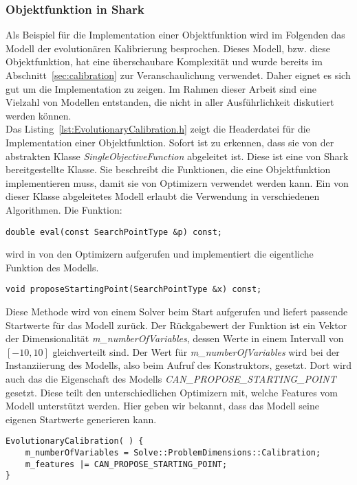 \subsubsection{Objektfunktion in Shark}
\label{sec:Shark_model}
%
Als Beispiel für die Implementation einer Objektfunktion wird im Folgenden das Modell der evolutionären Kalibrierung besprochen. Dieses Modell, bzw. diese Objektfunktion, hat eine überschaubare Komplexität und wurde bereits im Abschnitt~\ref{sec:calibration} zur Veranschaulichung verwendet. Daher eignet es sich gut um die Implementation zu zeigen. Im Rahmen dieser Arbeit sind eine Vielzahl von Modellen entstanden, die nicht in aller Ausführlichkeit diskutiert werden können.\\
%
Das Listing~\ref{lst:EvolutionaryCalibration.h} zeigt die Headerdatei für die Implementation einer Objektfunktion. Sofort ist zu erkennen, dass sie von der abstrakten Klasse \textit{SingleObjectiveFunction} abgeleitet ist. Diese ist eine von Shark bereitgestellte Klasse. Sie beschreibt die Funktionen, die eine Objektfunktion implementieren muss, damit sie von Optimizern verwendet werden kann. Ein von dieser Klasse abgeleitetes Modell erlaubt die Verwendung in verschiedenen Algorithmen. Die Funktion:
%
\begin{lstlisting}
double eval(const SearchPointType &p) const;
\end{lstlisting}
%
wird in von den Optimizern aufgerufen und implementiert die eigentliche Funktion des Modells.
%
\begin{lstlisting}[label=EvolutionaryCalibration_2]
void proposeStartingPoint(SearchPointType &x) const;
\end{lstlisting}
%
Diese Methode wird von einem Solver beim Start aufgerufen und liefert passende Startwerte für das Modell zurück.
Der Rückgabewert der Funktion ist ein Vektor der Dimensionalität  \textit{m\_numberOfVariables}, dessen Werte in einem Intervall von $[-10,10]$ gleichverteilt sind.
Der Wert für \textit{m\_numberOfVariables} wird bei der Instanziierung des Modells, also beim Aufruf des Konstruktors, gesetzt.
Dort wird auch das die Eigenschaft des Modells \textit{CAN\_PROPOSE\_STARTING\_POINT} gesetzt. Diese teilt den unterschiedlichen Optimizern mit, welche Features vom Modell unterstützt werden. Hier geben wir bekannt, dass das Modell seine eigenen Startwerte generieren kann.
%
\begin{lstlisting}[label=EvolutionaryCalibration_3]
	EvolutionaryCalibration( ) {
	m_numberOfVariables = Solve::ProblemDimensions::Calibration;
	m_features |= CAN_PROPOSE_STARTING_POINT;
}
\end{lstlisting}	
